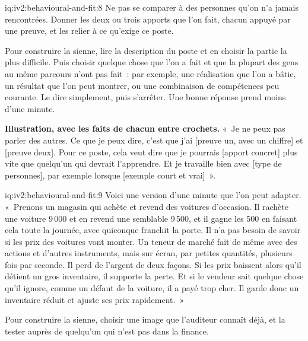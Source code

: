 \begin{solution}{iq:iv2:behavioural-and-fit:8}
Ne pas se comparer à des personnes qu'on n'a jamais rencontrées. Donner les deux ou trois apports que l'on fait, chacun appuyé par une preuve, et les relier à ce qu'exige ce poste.

Pour construire la sienne, lire la description du poste et en choisir la partie la plus difficile. Puis choisir quelque chose que l'on a fait et que la plupart des gens au même parcours n'ont pas fait~: par exemple, une réalisation que l'on a bâtie, un résultat que l'on peut montrer, ou une combinaison de compétences peu courante. Le dire simplement, puis s'arrêter. Une bonne réponse prend moins d'une minute.

\textbf{Illustration, avec les faits de chacun entre crochets.} «~Je ne peux pas parler des autres. Ce que je peux dire, c'est que j'ai [preuve un, avec un chiffre] et [preuve deux]. Pour ce poste, cela veut dire que je pourrais [apport concret] plus vite que quelqu'un qui devrait l'apprendre. Et je travaille bien avec [type de personnes], par exemple lorsque [exemple court et vrai]~».

\end{solution}

\begin{solution}{iq:iv2:behavioural-and-fit:9}
Voici une version d'une minute que l'on peut adapter. «~Prenons un magasin qui achète et revend des voitures d'occasion. Il rachète une voiture 9\,000 et en revend une semblable 9\,500, et il gagne les 500 en faisant cela toute la journée, avec quiconque franchit la porte. Il n'a pas besoin de savoir si les prix des voitures vont monter. Un teneur de marché fait de même avec des actions et d'autres instruments, mais sur écran, par petites quantités, plusieurs fois par seconde. Il perd de l'argent de deux façons. Si les prix baissent alors qu'il détient un gros inventaire, il supporte la perte. Et si le vendeur sait quelque chose qu'il ignore, comme un défaut de la voiture, il a payé trop cher. Il garde donc un inventaire réduit et ajuste ses prix rapidement.~»

Pour construire la sienne, choisir une image que l'auditeur connaît déjà, et la tester auprès de quelqu'un qui n'est pas dans la finance.

\end{solution}

